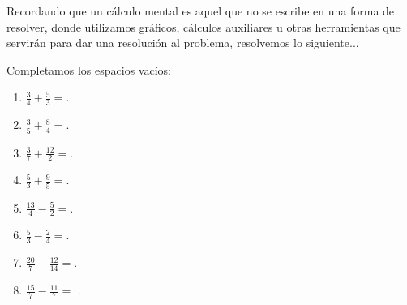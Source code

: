\documentclass[12pt]{examdesign}
\theoremstyle{plain}
\theoremstyle{definition}
\theoremstyle{remark}
\begin{document}
	
	
	\begin{fillin}[title={Completamos los espacios vacíos:}, resetcounter=no, rearrange=no]
		
		Recordando que un cálculo mental es aquel que no se escribe en una forma de resolver, donde utilizamos gráficos,
		cálculos auxiliares u otras herramientas que servirán para dar una resolución al problema, resolvemos lo siguiente...
		\begin{question}
			Completamos los espacios vacíos:
			\begin{enumerate}
				\item $\frac{3}{4}+\frac{5}{3} =$.
				\item $\frac{3}{5}+\frac{8}{4} =$.
				\item $\frac{3}{7}+\frac{12}{2}=$.
				\item $\frac{5}{3}+\frac{9}{5} =$.
				\item $\frac{13}{4}-\frac{5}{2}=$.
				\item $\frac{5}{3}-\frac{2}{4} =$.
				\item $\frac{20}{7}-\frac{12}{14}=$.
				\item $\frac{15}{7}-\frac{11}{7}=$ .
			\end{enumerate}
		\end{question}
	    
	    
	    
	\end{fillin}
\end{document}
